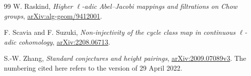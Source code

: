 \begin{thebibliography}{99}
W. Raskind, \emph{Higher \(\ell\)-adic Abel--Jacobi mappings and
filtrations on Chow groups},
\href{https://arxiv.org/abs/alg-geom/9412001}{arXiv:alg-geom/9412001}.

F. Scavia and F. Suzuki,
\emph{Non-injectivity of the cycle class map in continuous
\(\ell\)-adic cohomology},
\href{https://arxiv.org/abs/2208.06713}{arXiv:2208.06713}.

S.-W. Zhang, \emph{Standard conjectures and height pairings},
\href{https://arxiv.org/abs/2009.07089v3}{arXiv:2009.07089v3}.
The numbering cited here refers to the version of 29 April 2022.

\end{thebibliography}

